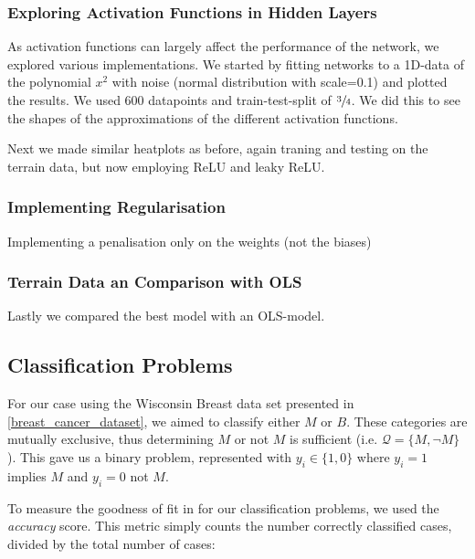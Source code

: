     \subsubsection{Exploring Activation Functions in Hidden Layers}
        As activation functions can largely affect the performance of the network, we explored various implementations. We started by fitting networks to a 1D-data of the polynomial $x^2$ with noise (normal distribution with scale=0.1) and plotted the results. We used 600 datapoints and train-test-split of $\sfrac{3}{4}$. We did this to see the shapes of the approximations of the different activation functions. 
        
        Next we made similar heatplots as before, again traning and testing on the terrain data, but now employing ReLU and leaky ReLU. 

    \subsubsection{Implementing Regularisation}
        Implementing a penalisation only on the weights (not the biases)

    \subsubsection{Terrain Data an Comparison with OLS}
        Lastly we compared the best model with an OLS-model. 
    
\subsection{Classification Problems}
    For our case using the Wisconsin Breast data set presented in \cref{breast_cancer_dataset}, we aimed to classify either $M$ or $B$. These categories are mutually exclusive, thus determining $M$ or not $M$ is sufficient (i.e. $\mathcal{Q} = \{ M, \neg M \}$). This gave us a binary problem, represented with $y_i \in \{ 1, 0 \}$ where $y_i = 1$ implies $M$ and $y_i = 0$ not $M$.

    To measure the goodness of fit in for our classification problems, we used the \textit{accuracy} score. This metric simply counts the number correctly classified cases, divided by the total number of cases:

